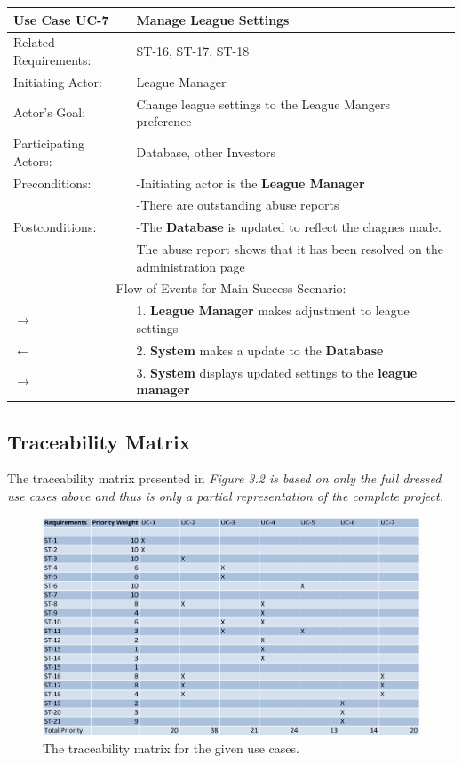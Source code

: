 \begin{centering}
\renewcommand\arraystretch{1.3} %
\label{UC-7}
\begin{longtable}{|p{1.2in} p{5in}|}
\hline
\bfseries{\color{color1}Use Case UC-7} &
\bfseries{\color{color1}Manage League Settings} \\
\hline
Related Requirements: & ST-16, ST-17, ST-18 \\
Initiating Actor:     & League Manager \\
Actor's Goal:         & Change league settings to the League Mangers preference \\
Participating Actors: & Database, other Investors \\
Preconditions:        & -Initiating actor is the \textbf{League Manager} \\
                      & -There are outstanding abuse reports \\
Postconditions:       & -The \textbf{Database} is updated to reflect the chagnes made. \\
 & The abuse report shows that it has been resolved on the administration page\\
\hline
\multicolumn{2}{|c|}{\color{color1}Flow of Events for Main Success Scenario:}\\
\hline

$\rightarrow$ & 1. \textbf{League Manager} makes adjustment to league settings \\
$\leftarrow$ & 2. \textbf{System} makes a update to the \textbf{Database} \\
$\rightarrow$ & 3. \textbf{System} displays updated settings to the \textbf{league manager} \\
\hline

\end{longtable}
\end{centering}

\subsection{Traceability Matrix}

The traceability matrix presented in \em Figure 3.2 \em is based on only the full
dressed use cases above and thus is only a partial representation of the complete project.\\

\begin{figure}
\centering
\includegraphics[width=5.5in]{./img/traceability.png}
\caption{The traceability matrix for the given use cases.}
\end{figure}

